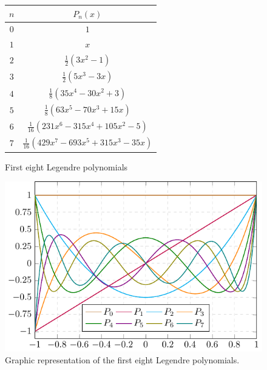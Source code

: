 \documentclass[../main.tex]{subfiles}
\begin{document}
\begin{figure}[ht]
  \centering
  \begin{minipage}[ht]{0.47\textwidth}
    \centering
    \captionsetup{type=table} %
    \begin{tabular}{|c|c|}
      \hline
      $n$ & $P_n(x)$                                 \\
      \hline\hline
      $0$ & $1$                                      \\
      $1$ & $x$                                      \\
      $2$ & $\frac{1}{2}(3x^2-1)$                    \\
      $3$ & $\frac{1}{2}(5x^3-3x)$                   \\
      $4$ & $\frac{1}{8}(35x^4-30x^2+3)$             \\
      $5$ & $\frac{1}{8}(63x^5-70x^3+15x)$           \\
      $6$ & $\frac{1}{16}(231x^6-315x^4+105x^2-5)$   \\
      $7$ & $\frac{1}{16}(429x^7-693x^5+315x^3-35x)$ \\
      \hline
    \end{tabular}
    \caption{First eight Legendre polynomials}
    \label{tab:legendre_polys}
  \end{minipage}
  \hspace{0.02\textwidth}
  \begin{minipage}[ht]{0.47\textwidth}
    \centering
    \includegraphics[width=\textwidth]{Images/legendre.pdf}
    \caption{Graphic representation of the first eight Legendre polynomials.}
  \end{minipage}
\end{figure}
\end{document}
